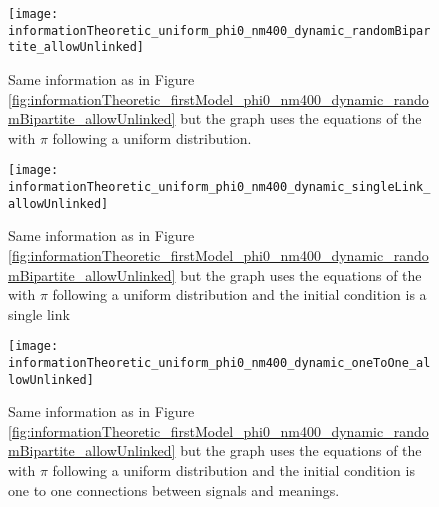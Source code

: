 \begin{figure}
  \centering
  \texttt{[image: informationTheoretic\_uniform\_phi0\_nm400\_dynamic\_randomBipartite\_allowUnlinked]}
  \caption{Same information as in Figure \ref{fig:informationTheoretic_firstModel_phi0_nm400_dynamic_randomBipartite_allowUnlinked} but the graph uses the equations of the \secondmodel{} with $\pi$ following a uniform distribution.}
  \label{fig:informationTheoretic_uniform_phi0_nm400_dynamic_randomBipartite_allowUnlinked}
\end{figure}

\begin{figure}
  \centering
  \texttt{[image: informationTheoretic\_uniform\_phi0\_nm400\_dynamic\_singleLink\_allowUnlinked]}
  \caption{Same information as in Figure \ref{fig:informationTheoretic_firstModel_phi0_nm400_dynamic_randomBipartite_allowUnlinked} but the graph uses the equations of the \secondmodel{} with $\pi$ following a uniform distribution and the initial condition is a single link}
  \label{fig:informationTheoretic_uniform_phi0_nm400_dynamic_singleLink_allowUnlinked}
\end{figure}

\begin{figure}
  \centering
  \texttt{[image: informationTheoretic\_uniform\_phi0\_nm400\_dynamic\_oneToOne\_allowUnlinked]}
  \caption{Same information as in Figure \ref{fig:informationTheoretic_firstModel_phi0_nm400_dynamic_randomBipartite_allowUnlinked} but the graph uses the equations of the \secondmodel{} with $\pi$ following a uniform distribution and the initial condition is one to one connections between signals and meanings.}
  \label{fig:informationTheoretic_uniform_phi0_nm400_dynamic_oneToOne_allowUnlinked}
\end{figure}

